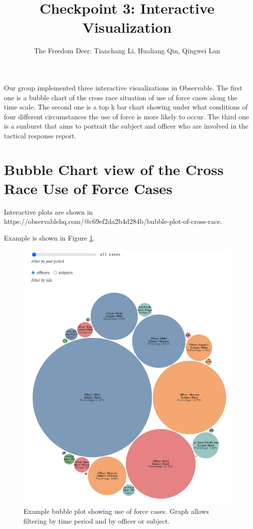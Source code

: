 \documentclass[10pt]{article}
\title{Checkpoint 3: Interactive Visualization}
\author{The Freedom Deer: Tianchang Li, Hualiang Qin, Qingwei Lan}
\begin{document}
\maketitle

Our group implemented three interactive visualizations in Observable. The first one is a bubble chart of the cross race situation of use of force cases along the time scale. The second one is a top k bar chart showing under what conditions of four different circumstances the use of force is more likely to occur. The third one is a sunburst that aims to portrait the subject and officer who are involved in the tactical response report.

\section{Bubble Chart view of the Cross Race Use of Force Cases}

Interactive plots are shown in \\ https://observablehq.com/@c69ef2da2b4d284b/bubble-plot-of-cross-race.

Example is shown in Figure \ref{bubbleplot-officer}.

\begin{figure}[h]
\centering
\includegraphics[scale=0.47]{bubbleplot-officer}
\caption{Example bubble plot showing use of force cases. Graph allows filtering by time period and by officer or subject.}
\label{bubbleplot-officer}
\end{figure}
\end{document}

